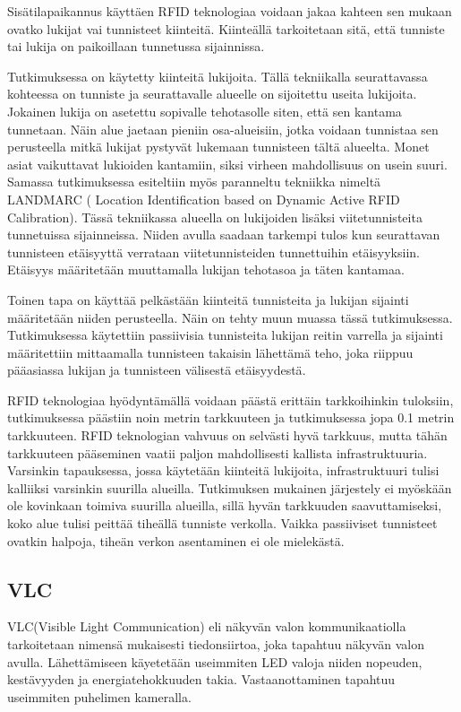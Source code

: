 Sisätilapaikannus käyttäen RFID teknologiaa voidaan jakaa kahteen sen mukaan ovatko lukijat vai tunnisteet kiinteitä. Kiinteällä tarkoitetaan sitä, että tunniste tai lukija on paikoillaan tunnetussa sijainnissa. 

Tutkimuksessa \cite{E} on käytetty kiinteitä lukijoita. Tällä tekniikalla seurattavassa kohteessa on tunniste ja seurattavalle alueelle on sijoitettu useita lukijoita. Jokainen lukija on asetettu sopivalle tehotasolle siten, että sen kantama tunnetaan. Näin alue jaetaan pieniin osa-alueisiin, jotka voidaan tunnistaa sen perusteella mitkä lukijat pystyvät lukemaan tunnisteen tältä alueelta. Monet asiat vaikuttavat lukioiden kantamiin, siksi virheen mahdollisuus on usein suuri.
Samassa tutkimuksessa\cite{E} esiteltiin myös paranneltu tekniikka nimeltä LANDMARC ( Location Identification based on Dynamic Active RFID Calibration). Tässä tekniikassa alueella on lukijoiden lisäksi viitetunnisteita tunnetuissa sijainneissa. Niiden avulla saadaan tarkempi tulos kun seurattavan tunnisteen etäisyyttä verrataan viitetunnisteiden tunnettuihin etäisyyksiin. Etäisyys määritetään muuttamalla lukijan tehotasoa ja täten kantamaa.

Toinen tapa on käyttää pelkästään kiinteitä tunnisteita ja lukijan sijainti määritetään niiden perusteella. Näin on tehty muun muassa tässä tutkimuksessa\cite{F}. Tutkimuksessa käytettiin passiivisia tunnisteita lukijan reitin varrella ja sijainti määritettiin mittaamalla tunnisteen takaisin lähettämä teho, joka riippuu pääasiassa lukijan ja tunnisteen välisestä etäisyydestä\cite{F}.

RFID teknologiaa hyödyntämällä voidaan päästä erittäin tarkkoihinkin tuloksiin, tutkimuksessa \cite{E} päästiin noin metrin tarkkuuteen ja tutkimuksessa \cite{F} jopa 0.1 metrin tarkkuuteen. RFID teknologian vahvuus on selvästi hyvä tarkkuus, mutta tähän tarkkuuteen pääseminen vaatii paljon mahdollisesti kallista infrastruktuuria. Varsinkin tapauksessa\cite{E}, jossa käytetään kiinteitä lukijoita, infrastruktuuri tulisi kalliiksi varsinkin suurilla alueilla. Tutkimuksen\cite{F} mukainen järjestely ei myöskään ole kovinkaan toimiva suurilla alueilla, sillä hyvän tarkkuuden saavuttamiseksi, koko alue tulisi peittää tiheällä tunniste verkolla. Vaikka passiiviset tunnisteet ovatkin halpoja\cite{F}, tiheän verkon asentaminen ei ole mielekästä.

\subsection{VLC}
VLC(Visible Light Communication) eli näkyvän valon kommunikaatiolla tarkoitetaan nimensä mukaisesti tiedonsiirtoa, joka tapahtuu näkyvän valon avulla\cite{VLCA}. Lähettämiseen käyetetään useimmiten LED valoja niiden nopeuden, kestävyyden ja energiatehokkuuden takia. Vastaanottaminen tapahtuu useimmiten puhelimen kameralla.

